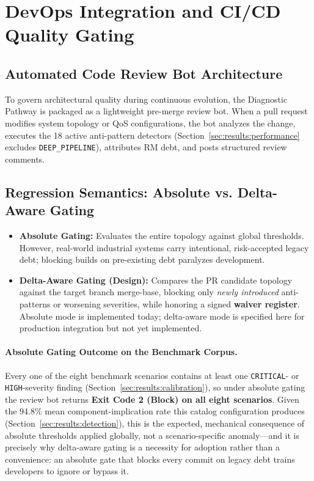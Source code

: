 \section{DevOps Integration and CI/CD Quality Gating}
\label{sec:cicd_gating}

\subsection{Automated Code Review Bot Architecture}
\label{sec:cicd:bot}

To govern architectural quality during continuous evolution, the Diagnostic Pathway is packaged as a lightweight pre-merge review bot. When a pull request modifies system topology or QoS configurations, the bot analyzes the change, executes the 18 active anti-pattern detectors (Section~\ref{sec:results:performance} excludes \texttt{DEEP\_PIPELINE}), attributes RM debt, and posts structured review comments.

\subsection{Regression Semantics: Absolute vs. Delta-Aware Gating}
\label{sec:cicd:semantics}

\begin{itemize}
    \item \textbf{Absolute Gating:} Evaluates the entire topology against global thresholds. However, real-world industrial systems carry intentional, risk-accepted legacy debt; blocking builds on pre-existing debt paralyzes development.
    \item \textbf{Delta-Aware Gating (Design):} Compares the PR candidate topology against the target branch merge-base, blocking only \emph{newly introduced} anti-patterns or worsening severities, while honoring a signed \textbf{waiver register}. Absolute mode is implemented today; delta-aware mode is specified here for production integration but not yet implemented.
\end{itemize}

\paragraph{Absolute Gating Outcome on the Benchmark Corpus.} Every one of the eight benchmark scenarios contains at least one \texttt{CRITICAL}- or \texttt{HIGH}-severity finding (Section~\ref{sec:results:calibration}), so under absolute gating the review bot returns \textbf{Exit Code 2 (Block) on all eight scenarios}. Given the $94.8\%$ mean component-implication rate this catalog configuration produces (Section~\ref{sec:results:detection}), this is the expected, mechanical consequence of absolute thresholds applied globally, not a scenario-specific anomaly---and it is precisely why delta-aware gating is a necessity for adoption rather than a convenience: an absolute gate that blocks every commit on legacy debt trains developers to ignore or bypass it.

